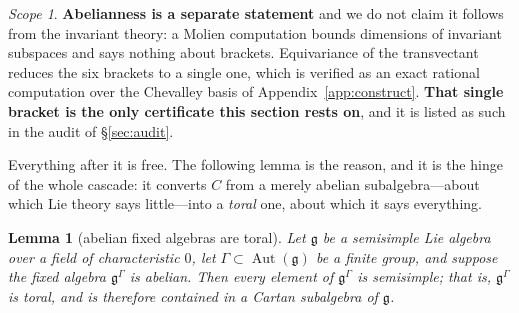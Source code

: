 \documentclass[11pt,reqno]{amsart}
\theoremstyle{plain}
\newtheorem{lemma}[theorem]{Lemma}
\theoremstyle{definition}
\theoremstyle{remark}
\newtheorem{scope}[theorem]{Scope}
\newcommand{\Aut}{\operatorname{Aut}}
\newcommand{\g}{\mathfrak{g}}
\begin{document}
\begin{scope}\label{sc:abelian}
\textbf{Abelianness is a separate statement} and we do not claim it follows from the
invariant theory: a Molien computation bounds dimensions of invariant subspaces and says
nothing about brackets. Equivariance of the transvectant reduces the six brackets to a
single one, which is verified as an exact rational computation over the Chevalley basis
of Appendix~\ref{app:construct}. \textbf{That single bracket is the only certificate this
section rests on}, and it is listed as such in the audit of \S\ref{sec:audit}.
\end{scope}

Everything after it is free. The following lemma is the reason, and it is the hinge of
the whole cascade: it converts $C$ from a merely abelian subalgebra---about which Lie
theory says little---into a \emph{toral} one, about which it says everything.

\begin{lemma}[abelian fixed algebras are toral]\label{lem:toral}
Let $\g$ be a semisimple Lie algebra over a field of characteristic $0$, let
$\Gamma\subset\Aut(\g)$ be a finite group, and suppose the fixed algebra $\g^\Gamma$ is
abelian. Then every element of $\g^\Gamma$ is semisimple; that is, $\g^\Gamma$ is toral,
and is therefore contained in a Cartan subalgebra of $\g$.
\end{lemma}
\end{document}
